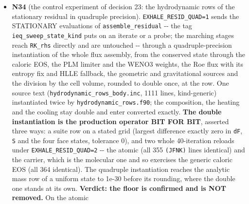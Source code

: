 \documentclass[english,a4paper]{my_memo}
\begin{document}
\begin{itemize}
  out of scope. Advisor: rebuild on \texttt{build\_lwv}; \texttt{krylov\_and\_dogleg} 220/0, \texttt{steady\_species\_rows} 194/0; atomic reload at cap 40 with every hook off, 8 threads: the N31 ladder to the digit (7.607e-2 at 40, handed back 5.377e-2, spread 3.555e-3), no \texttt{{[}diag\ 14{]}} line; two British spellings in the new comments fixed. Accepted; deliverable 2 correctly not built (there is no branch to smooth). The finding is structural and reaches the marching discretization, so it is put to the user as DECISION 23 (well-balanced flux differencing recommended; quad accumulation of the flux difference as the control experiment; coarser base cells; accept the floor). The \texttt{count} global shadowing the intrinsic recorded in ISSUES 3.7 (HYG). \textbf{Next item N34} (runs without a decision, changes no default): the control experiment, quad accumulation of the face fluxes and their difference inside the stationary residual only, as a measured arm.
\item
  \textbf{N34} (the control experiment of decision 23: the hydrodynamic rows of
  the stationary residual in quadruple precision). \texttt{EXHALE\_RESID\_QUAD=1}
  sends the STATIONARY evaluations of \texttt{assemble\_residual} -\/- the tag
  \texttt{ieq\_sweep\_state\_kind} puts on an iterate or a probe; the marching
  stages reach \texttt{RK\_rhs} directly and are untouched -\/- through a
  quadruple-precision instantiation of the whole flux assembly, from the
  conserved state through the caloric EOS, the PLM limiter and the WENO3
  weights, the Roe flux with its entropy fix and HLLE fallback, the
  geometric and gravitational sources and the division by the cell volume,
  rounded to double once, at the row. One source text
  (\texttt{hydrodynamic\_rows\_body.inc}, 1111 lines, kind-generic) instantiated
  twice by \texttt{hydrodynamic\_rows.f90}; the composition, the heating and the
  cooling stay double and enter converted exactly. \textbf{The double
  instantiation is the production operator BIT FOR BIT}, asserted three
  ways: a suite row on a stated grid (largest difference exactly zero in
  \texttt{dF}, \texttt{S} and the four face states, tolerance 0), and two whole
  40-iteration reloads under \texttt{EXHALE\_RESID\_QUAD=2} -\/- the atomic (all 355
  \texttt{(JFNK)} lines identical) and the carrier, which is the molecular one
  and so exercises the generic caloric EOS (all 364 identical). The
  quadruple instantiation reaches the analytic mass row of a uniform state
  to 1e-30 before its rounding, where the double one stands at its own.
  \textbf{Verdict: the floor is confirmed and is NOT removed.} On the atomic

\end{itemize}
\end{document}
